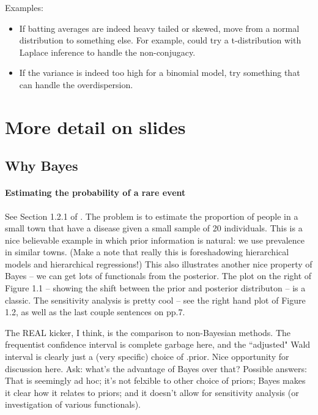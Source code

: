 \documentclass{article} %
\begin{document}
Examples:
\begin{itemize}
\item If batting averages are indeed heavy tailed or skewed,  move from a normal distribution to something else.   For example,  could try a t-distribution with Laplace inference to handle the non-conjugacy. 
\item If the variance is indeed too high for a binomial model,  try something that can handle the overdispersion. 
\end{itemize}

\section{More detail on slides}

\subsection{Why Bayes}

\paragraph{Estimating the probability of a rare event}
See Section 1.2.1 of \cite{hoff2009first}.  The problem is to estimate the proportion of people in a small town that have a disease given a small sample of 20 individuals.     This is a nice believable example in which prior information is natural: we use prevalence in similar towns.  (Make a note that really this is foreshadowing hierarchical models and hierarchical regressions!)  This also illustrates another nice property of Bayes  -- we can get lots of functionals from the posterior.  The plot on the right of Figure 1.1 -- showing the shift between the prior and posterior distributon -- is a classic.   The sensitivity analysis is pretty cool -- see the right hand plot of Figure 1.2,  as well as the last couple sentences on pp.7.    

The REAL kicker,  I think,  is the comparison to non-Bayesian methods.  The frequentist confidence interval is complete garbage here,  and the ``adjusted" Wald interval is clearly just a (very specific) choice of .prior.   Nice opportunity for discussion here.  Ask:  what's the advantage of Bayes over that?  Possible answers: That is seemingly ad hoc; it's not felxible to other choice of priors; Bayes makes it clear how it relates to priors; and it doesn't allow for sensitivity analysis (or investigation of various functionals).  
\end{document}
